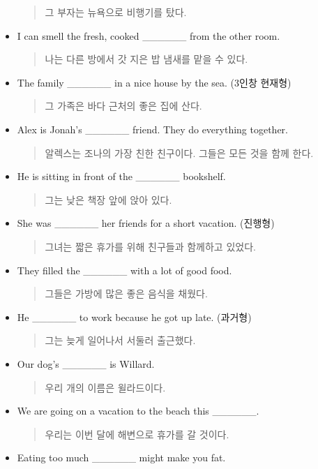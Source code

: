 \documentclass{article}
\begin{document}
\begin{addmargin}[1em]{1em}
\begin{itemize}
    \begin{quote}
    그 부자는 뉴욕으로 비행기를 탔다.
    \end{quote}
    \item I can smell the fresh, cooked \_\_\_\_\_\_ from the other room.
    \begin{quote}
    나는 다른 방에서 갓 지은 밥 냄새를 맡을 수 있다.
    \end{quote}
    \item The family \_\_\_\_\_\_ in a nice house by the sea. (3인창 현재형)
    \begin{quote}
    그 가족은 바다 근처의 좋은 집에 산다.
    \end{quote}
    \item Alex is Jonah's \_\_\_\_\_\_ friend. They do everything together.
    \begin{quote}
    알렉스는 조나의 가장 친한 친구이다. 그들은 모든 것을 함께 한다.
    \end{quote}
    \item He is sitting in front of the \_\_\_\_\_\_ bookshelf.
    \begin{quote}
    그는 낮은 책장 앞에 앉아 있다.
    \end{quote}
    \newpage
    \item She was \_\_\_\_\_\_ her friends for a short vacation. (진행형)
    \begin{quote}
    그녀는 짧은 휴가를 위해 친구들과 함께하고 있었다.
    \end{quote}
    \item They filled the \_\_\_\_\_\_ with a lot of good food.
    \begin{quote}
    그들은 가방에 많은 좋은 음식을 채웠다.
    \end{quote}
    \item He \_\_\_\_\_\_ to work because he got up late. (과거형)
    \begin{quote}
    그는 늦게 일어나서 서둘러 출근했다.
    \end{quote}
    \item Our dog's \_\_\_\_\_\_ is Willard.
    \begin{quote}
    우리 개의 이름은 윌라드이다.
    \end{quote}
    \item We are going on a vacation to the beach this \_\_\_\_\_\_.
    \begin{quote}
    우리는 이번 달에 해변으로 휴가를 갈 것이다.
    \end{quote}
    \item Eating too much \_\_\_\_\_\_ might make you fat.

\end{itemize}
\end{addmargin}
\end{document}
